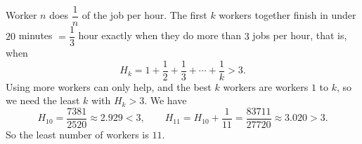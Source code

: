 Worker $n$ does $\dfrac{1}{n}$ of the job per hour. The first $k$ workers together finish in under $20$ minutes $=\dfrac{1}{3}$ hour exactly when they do more than $3$ jobs per hour, that is, when
\[
H_k=1+\dfrac{1}{2}+\dfrac{1}{3}+\cdots+\dfrac{1}{k}>3 .
\]
Using more workers can only help, and the best $k$ workers are workers $1$ to $k$, so we need the least $k$ with $H_k>3$. We have
\[
H_{10}=\dfrac{7381}{2520}\approx2.929<3,\qquad H_{11}=H_{10}+\dfrac{1}{11}=\dfrac{83711}{27720}\approx3.020>3 .
\]
So the least number of workers is $\boxed{11}$.
